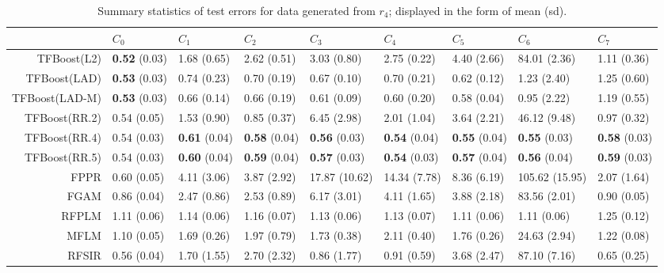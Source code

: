 \begin{table}[H]
\centering
\begin{tabular}{rllllllll}
  \hline
 & $C_0$ & $C_1$ & $C_2$ & $C_3$ & $C_4$ & $C_5$ & $C_6$ & $C_7$ \\ 
  \hline
TFBoost(L2) & \textbf{0.52} (0.03) & 1.68 (0.65) & 2.62 (0.51) & 3.03 (0.80) & 2.75 (0.22) & 4.40 (2.66) & 84.01 (2.36) & 1.11 (0.36) \\ 
  TFBoost(LAD) & \textbf{0.53} (0.03) & 0.74 (0.23) & 0.70 (0.19) & 0.67 (0.10) & 0.70 (0.21) & 0.62 (0.12) & 1.23 (2.40) & 1.25 (0.60) \\ 
  TFBoost(LAD-M) & \textbf{0.53} (0.03) & 0.66 (0.14) & 0.66 (0.19) & 0.61 (0.09) & 0.60 (0.20) & 0.58 (0.04) & 0.95 (2.22) & 1.19 (0.55) \\ 
  TFBoost(RR.2) & 0.54 (0.05) & 1.53 (0.90) & 0.85 (0.37) & 6.45 (2.98) & 2.01 (1.04) & 3.64 (2.21) & 46.12 (9.48) & 0.97 (0.32) \\ 
  TFBoost(RR.4) & 0.54 (0.03) & \textbf{0.61} (0.04) & \textbf{0.58} (0.04) & \textbf{0.56} (0.03) & \textbf{0.54} (0.04) & \textbf{0.55} (0.04) & \textbf{0.55} (0.03) & \textbf{0.58} (0.03) \\ 
  TFBoost(RR.5) & 0.54 (0.03) & \textbf{0.60} (0.04) & \textbf{0.59} (0.04) & \textbf{0.57} (0.03) & \textbf{0.54} (0.03) & \textbf{0.57} (0.04) & \textbf{0.56} (0.04) & \textbf{0.59} (0.03) \\ 
  FPPR & 0.60 (0.05) & 4.11 (3.06) & 3.87 (2.92) & 17.87 (10.62) & 14.34 (7.78) & 8.36 (6.19) & 105.62 (15.95) & 2.07 (1.64) \\ 
  FGAM & 0.86 (0.04) & 2.47 (0.86) & 2.53 (0.89) & 6.17 (3.01) & 4.11 (1.65) & 3.88 (2.18) & 83.56 (2.01) & 0.90 (0.05) \\ 
  RFPLM & 1.11 (0.06) & 1.14 (0.06) & 1.16 (0.07) & 1.13 (0.06) & 1.13 (0.07) & 1.11 (0.06) & 1.11 (0.06) & 1.25 (0.12) \\ 
  MFLM & 1.10 (0.05) & 1.69 (0.26) & 1.97 (0.79) & 1.73 (0.38) & 2.11 (0.40) & 1.76 (0.26) & 24.63 (2.94) & 1.22 (0.08) \\ 
  RFSIR & 0.56 (0.04) & 1.70 (1.55) & 2.70 (2.32) & 0.86 (1.77) & 0.91 (0.59) & 3.68 (2.47) & 87.10 (7.16) & 0.65 (0.25) \\ 
   \hline
\end{tabular}
\caption{Summary statistics of test errors for data generated from $r_4$; displayed in the form of mean (sd).} 
\end{table}
